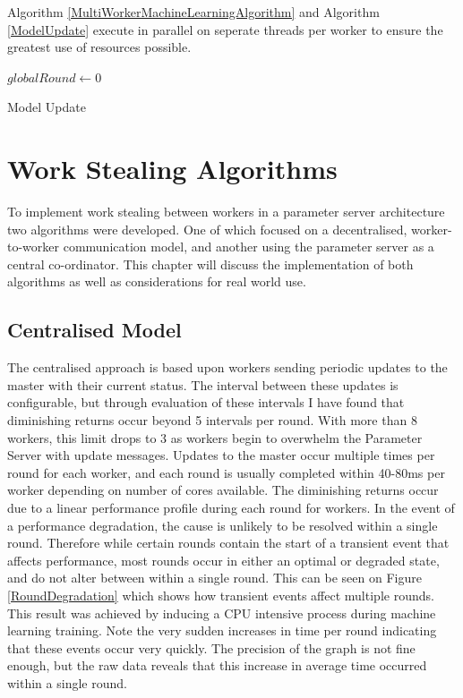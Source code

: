 \documentclass[12pt]{article}
\begin{document}
\medskip
\medskip

Algorithm \ref{MultiWorkerMachineLearningAlgorithm} and Algorithm \ref{ModelUpdate} execute in parallel on seperate threads per worker to ensure the greatest use of resources possible.
\newline

\IncMargin{1em}
\begin{algorithm}[H]
  $globalRound \longleftarrow 0$\;
 \caption{Model Update}
 \label{ModelUpdate}
\end{algorithm}
\DecMargin{1em}
\medskip

\newpage

\section{Work Stealing Algorithms} \label{algorithms}

To implement work stealing between workers in a parameter server architecture two algorithms were developed. One of which focused on a decentralised, worker-to-worker communication model, and another using the parameter server as a central co-ordinator. This chapter will discuss the implementation of both algorithms as well as considerations for real world use.

\subsection{Centralised Model}

The centralised approach is based upon workers sending periodic updates to the master with their current status. The interval between these updates is configurable, but through evaluation of these intervals I have found that diminishing returns occur beyond 5 intervals per round. With more than 8 workers, this limit drops to 3 as workers begin to overwhelm the Parameter Server with update messages.
\newline
\newline
Updates to the master occur multiple times per round for each worker, and each round is usually completed within 40-80ms per worker depending on number of cores available. The diminishing returns occur due to a linear performance profile during each round for workers. In the event of a performance degradation, the cause is unlikely to be resolved within a single round. Therefore while certain rounds contain the start of a transient event that affects performance, most rounds occur in either an optimal or degraded state, and do not alter between within a single round. This can be seen on Figure \ref{RoundDegradation} which shows how transient events affect multiple rounds. This result was achieved by inducing a CPU intensive process during machine learning training. Note the very sudden increases in time per round indicating that these events occur very quickly. The precision of the graph is not fine enough, but the raw data reveals that this increase in average time occurred within a single round.
\end{document}
